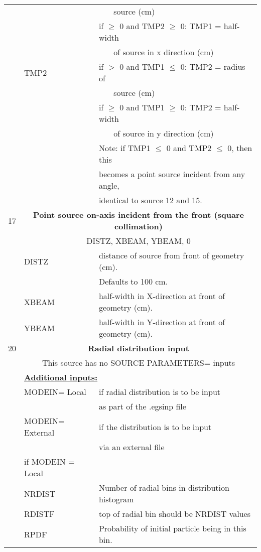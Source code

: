\begin{longtable}{lll}
  &         & ~~~ source (cm)\\
  &         & if $\geq$ 0 and TMP2 $\geq$ 0: TMP1 = half-width\\
  &         & ~~~ of source in x direction (cm)\\
  & TMP2    & if $>$ 0 and TMP1 $\leq$ 0: TMP2 = radius of\\
  &         & ~~~ source (cm)\\
  &         & if $\geq$ 0 and TMP1 $\geq$ 0: TMP2 = half-width\\
  &         & ~~~ of source in y direction (cm)\\
  &         & Note: if TMP1 $\leq$ 0 and TMP2 $\leq$ 0, then this\\
  &         & becomes a point source incident from any angle,\\
  &         & identical to source 12 and 15.\\
\hline
17&\multicolumn{2}{c}{\bf Point source on-axis incident from the front (square collimation)}\\
&\multicolumn{2}{c}{DISTZ, XBEAM, YBEAM, 0}\\
& DISTZ & distance of source from front of geometry (cm).\\
&& Defaults to 100 cm.\\
& XBEAM & half-width in X-direction at front of geometry (cm).\\
& YBEAM & half-width in Y-direction at front of geometry (cm).\\
\hline
20&\multicolumn{2}{c}{\bf Radial distribution input}\\
  & \multicolumn{2}{c}{This source has no SOURCE PARAMETERS= inputs}\\
  & \multicolumn{2}{l}{\bf \underline {Additional inputs:}}\\
  & MODEIN= Local & if radial distribution is to be input\\
  &               & as part of the .egsinp file\\
  & MODEIN= External& if the distribution is to be input\\
  &               & via an external file\\
  &if MODEIN = Local &  \\
  & NRDIST       & Number of radial bins in distribution histogram\\
  & RDISTF       & top of radial bin should be NRDIST values \\
  & RPDF         & Probability of initial particle being in this bin.\\

\end{longtable}
